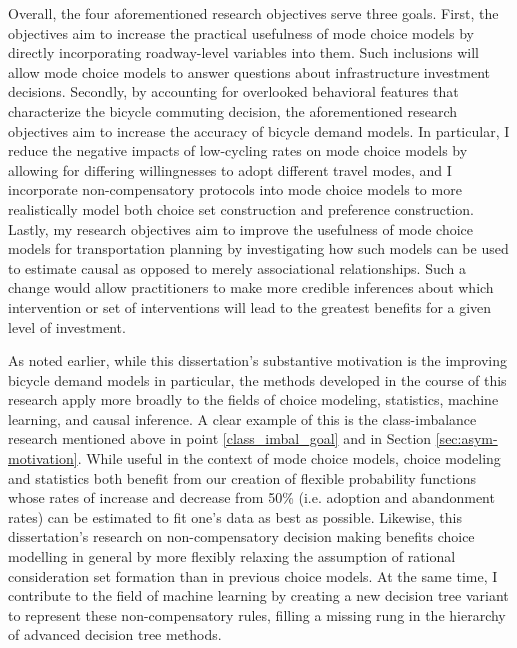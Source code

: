 \documentclass{article}
\begin{document}
Overall, the four aforementioned research objectives serve three goals. First, the objectives aim to increase the practical usefulness of mode choice models by directly incorporating roadway-level variables into them. Such inclusions will allow mode choice models to answer questions about infrastructure investment decisions. Secondly, by accounting for overlooked behavioral features that characterize the bicycle commuting decision, the aforementioned research objectives aim to increase the accuracy of bicycle demand models. In particular, I reduce the negative impacts of low-cycling rates on mode choice models by allowing for differing willingnesses to adopt different travel modes, and I incorporate non-compensatory protocols into mode choice models to more realistically model both choice set construction and preference construction. Lastly, my research objectives aim to improve the usefulness of mode choice models for transportation planning by investigating how such models can be used to estimate causal as opposed to merely associational relationships. Such a change would allow practitioners to make more credible inferences about which intervention or set of interventions will lead to the greatest benefits for a given level of investment.

As noted earlier, while this dissertation's substantive motivation is the improving bicycle demand models in particular, the methods developed in the course of this research apply more broadly to the fields of choice modeling, statistics, machine learning, and causal inference. A clear example of this is the class-imbalance research mentioned above in point \ref{class_imbal_goal} and in Section \ref{sec:asym-motivation}. While useful in the context of mode choice models, choice modeling and statistics both benefit from our creation of flexible probability functions whose rates of increase and decrease from 50\% (i.e. adoption and abandonment rates) can be estimated to fit one's data as best as possible. Likewise, this dissertation's research on non-compensatory decision making benefits choice modelling in general by more flexibly relaxing the assumption of rational consideration set formation than in previous choice models. At the same time, I contribute to the field of machine learning by creating a new decision tree variant to represent these non-compensatory rules, filling a missing rung in the hierarchy of advanced decision tree methods.
\end{document}
